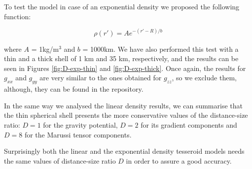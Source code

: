 \documentclass[extra]{gji}
\begin{document}
To test the model in case of an exponential density we proposed the following function:

\begin{equation}
    \rho(r') = A e^{-(r' - R)/b}
\label{eq:density-exp}
\end{equation}

\noindent where $A$ = 1kg/m$^3$ and $b$ = 1000km.
We have also performed this test with a thin and a thick shell of 1 km and 35 km, respectively, and the results can be seen in Figures \ref{fig:D-exp-thin} and \ref{fig:D-exp-thick}.
Once again, the results for $g_{xx}$ and $g_{yy}$ are very similar to the ones obtained for $g_{zz}$, so we exclude them, although, they can be found in the repository.

In the same way we analysed the linear density results, we can summarise that the thin spherical shell presents the more conservative values of the distance-size ratio: $D=1$ for the gravity potential, $D=2$ for its gradient components and $D=8$ for the Marussi tensor components.

Surprisingly both the linear and the exponential density tesseroid models needs the same values of distance-size ratio $D$ in order to assure a good accuracy.
\end{document}
